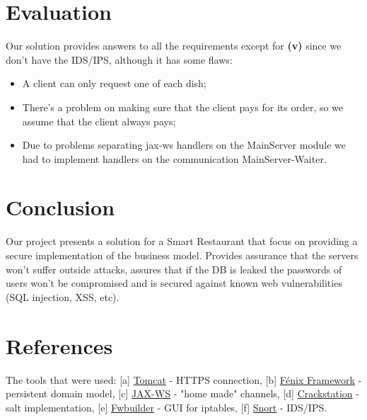 \documentclass[12pt,paper=a4]{article}
\begin{document}
\section{Evaluation}
Our solution provides answers to all the requirements except for \textbf{(v)} since we don't have the IDS/IPS, although it has some flaws:
\begin{itemize}
\item A client can only request one of each dish;
\item There’s a problem on making sure that the client pays for its order, so we assume that the client always pays;
\item Due to problems separating jax-ws handlers on the MainServer module we had to implement handlers on the communication MainServer-Waiter.
\end{itemize}
\section{Conclusion}
Our project presents a solution for a Smart Restaurant that focus on providing a secure implementation of the business model. Provides assurance that the servers won’t suffer outside attacks, assures that if the DB is leaked the passwords of users won’t be compromised and is secured against known web vulnerabilities (SQL injection, XSS, etc).
\section{References}
The tools that were used: [a] \href{http://tomcat.apache.org/}{Tomcat} - HTTPS connection, [b] \href{https://fenix-framework.github.io/}{Fénix Framework} - persistent domain model, [c] \href{https://jax-ws.java.net/}{JAX-WS} - "home made" channels, [d] \href{https://crackstation.net/hashing-security.htm}{Crackstation} - salt implementation, [e] \href{http://www.fwbuilder.org/}{Fwbuilder} - GUI for iptables, [f] \href{https://www.snort.org/}{Snort} - IDS/IPS.
\end{document}
